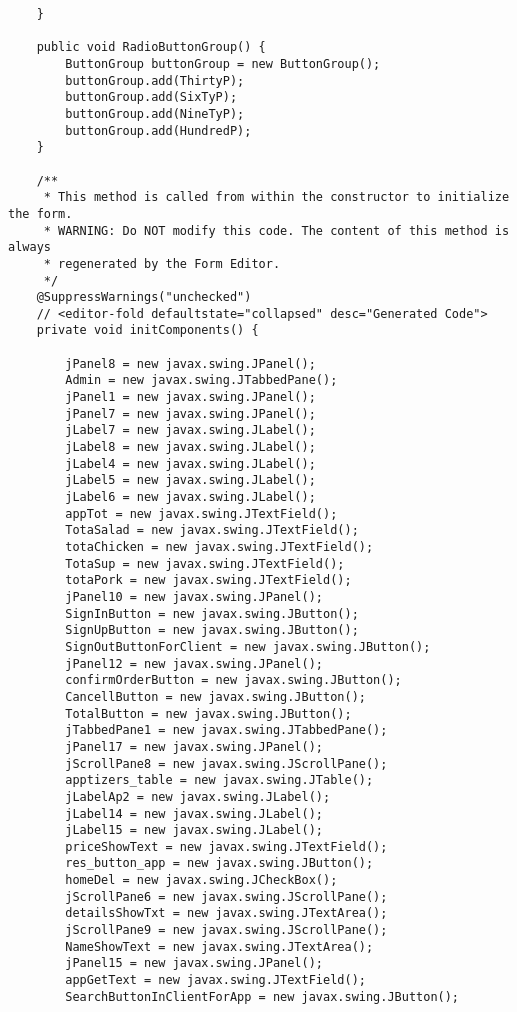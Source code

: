 \documentclass[12pt,a4paper]{article}
\begin{document}
\begin{lstlisting}
    }

    public void RadioButtonGroup() {
        ButtonGroup buttonGroup = new ButtonGroup();
        buttonGroup.add(ThirtyP);
        buttonGroup.add(SixTyP);
        buttonGroup.add(NineTyP);
        buttonGroup.add(HundredP);
    }

    /**
     * This method is called from within the constructor to initialize the form.
     * WARNING: Do NOT modify this code. The content of this method is always
     * regenerated by the Form Editor.
     */
    @SuppressWarnings("unchecked")
    // <editor-fold defaultstate="collapsed" desc="Generated Code">                          
    private void initComponents() {

        jPanel8 = new javax.swing.JPanel();
        Admin = new javax.swing.JTabbedPane();
        jPanel1 = new javax.swing.JPanel();
        jPanel7 = new javax.swing.JPanel();
        jLabel7 = new javax.swing.JLabel();
        jLabel8 = new javax.swing.JLabel();
        jLabel4 = new javax.swing.JLabel();
        jLabel5 = new javax.swing.JLabel();
        jLabel6 = new javax.swing.JLabel();
        appTot = new javax.swing.JTextField();
        TotaSalad = new javax.swing.JTextField();
        totaChicken = new javax.swing.JTextField();
        TotaSup = new javax.swing.JTextField();
        totaPork = new javax.swing.JTextField();
        jPanel10 = new javax.swing.JPanel();
        SignInButton = new javax.swing.JButton();
        SignUpButton = new javax.swing.JButton();
        SignOutButtonForClient = new javax.swing.JButton();
        jPanel12 = new javax.swing.JPanel();
        confirmOrderButton = new javax.swing.JButton();
        CancellButton = new javax.swing.JButton();
        TotalButton = new javax.swing.JButton();
        jTabbedPane1 = new javax.swing.JTabbedPane();
        jPanel17 = new javax.swing.JPanel();
        jScrollPane8 = new javax.swing.JScrollPane();
        apptizers_table = new javax.swing.JTable();
        jLabelAp2 = new javax.swing.JLabel();
        jLabel14 = new javax.swing.JLabel();
        jLabel15 = new javax.swing.JLabel();
        priceShowText = new javax.swing.JTextField();
        res_button_app = new javax.swing.JButton();
        homeDel = new javax.swing.JCheckBox();
        jScrollPane6 = new javax.swing.JScrollPane();
        detailsShowTxt = new javax.swing.JTextArea();
        jScrollPane9 = new javax.swing.JScrollPane();
        NameShowText = new javax.swing.JTextArea();
        jPanel15 = new javax.swing.JPanel();
        appGetText = new javax.swing.JTextField();
        SearchButtonInClientForApp = new javax.swing.JButton();

\end{lstlisting}
\end{document}
